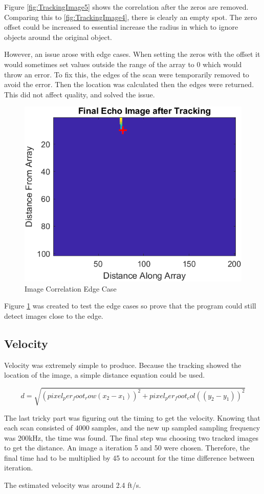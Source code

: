 Figure \ref{fig:TrackingImage5} shows the correlation after the zeros are removed. Comparing this to \ref{fig:TrackingImage4}, there is clearly an empty spot. The zero offset could be increased to essential increase the radius in which to ignore objects around the original object.

However, an issue arose with edge cases. When setting the zeros with the offset it would sometimes set values outside the range of the array to 0 which would throw an error. To fix this, the edges of the scan were temporarily removed to avoid the error. Then the location was calculated then the edges were returned. This did not affect quality, and solved the issue.

\begin{figure}[H]
    \centering
    \includegraphics[width=0.5\linewidth]{figures/TrackingImage6.png}
    \caption{Image Correlation Edge Case}
    \label{fig:TrackingImage6}
\end{figure}

Figure \ref{fig:TrackingImage6} was created to test the edge cases so prove that the program could still detect images close to the edge.

\subsection{Velocity}

Velocity was extremely simple to produce. Because the tracking showed the location of the image, a simple distance equation could be used.

\begin{equation}
    d = \sqrt{(pixel_per_foot_row(x_{2} - x_{1}))^{2} + pixel_per_foot_col((y_{2} - y_{1}))^{2}}
    \label{eq:distanceEQ}
\end{equation}

The last tricky part was figuring out the timing to get the velocity. Knowing that each scan consisted of 4000 samples, and the new up sampled sampling frequency was 200kHz, the time was found. The final step was choosing two tracked images to get the distance. An image a iteration 5 and 50 were chosen. Therefore, the final time had to be multiplied by 45 to account for the time difference between iteration.

The estimated velocity was around 2.4 ft/s.


